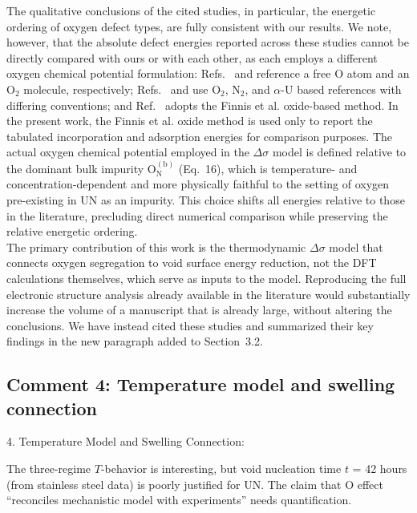 \documentclass[12pt]{article}
\begin{document}
\color{black}


The qualitative conclusions of the cited studies, in particular, the energetic ordering of oxygen defect types, are fully consistent with our results. We note, however, that the absolute defect energies reported across these studies cannot be directly compared with ours or with each other, as each employs a different oxygen chemical potential formulation: Refs.~\cite{Zhukovskii2009SS} and \cite{Zhukovskii2009JNM} reference a free O atom and an O$_2$ molecule, respectively; Refs.~\cite{Bocharov2011JNM} and \cite{Bocharov2011SS} use O$_2$, N$_2$, and $\alpha$-U based references with differing conventions; and Ref.~\cite{Bocharov2013} adopts the Finnis et al. \cite{Finnis2005} oxide-based method. In the present work, the Finnis et al. oxide method is used only to report the tabulated incorporation and adsorption energies for comparison purposes. The actual oxygen chemical potential employed in the $\Delta\sigma$ model is defined relative to the dominant bulk impurity $\mathrm{O_N^{(b)}}$ (Eq.~16), which is temperature- and concentration-dependent and more physically faithful to the setting of oxygen pre-existing in UN as an impurity. This choice shifts all energies relative to those in the literature, precluding direct numerical comparison while preserving the relative energetic ordering.\\

The primary contribution of this work is the thermodynamic $\Delta\sigma$ model that connects oxygen segregation to void surface energy reduction, not the DFT calculations themselves, which serve as inputs to the model. Reproducing the full electronic structure analysis already available in the literature would substantially increase the volume of a manuscript that is already large, without altering the conclusions. We have instead cited these studies and summarized their key findings in the new paragraph added to Section~3.2.


\subsection*{Comment 4: Temperature model and swelling connection}

\color{blue}

4. Temperature Model and Swelling Connection:

The three-regime $T$-behavior is interesting, but void nucleation time $t$ = 42 hours (from stainless steel data) is poorly justified for UN. The claim that O effect ``reconciles mechanistic model with experiments'' needs quantification.\\
\end{document}
